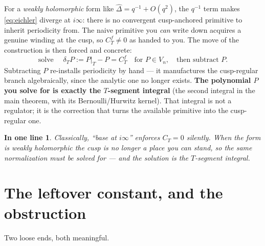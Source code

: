 \documentclass[11pt]{article}
\newcommand{\Vn}{V_n}
\newtheorem*{slogan}{In one line}
\begin{document}
For a \emph{weakly holomorphic} form like $\widehat\Delta = q^{-1} +
O(q^2)$, the $q^{-1}$ term makes \eqref{eq:eichler} diverge at $i\infty$:
there is no convergent cusp-anchored primitive to inherit periodicity
from. The naive primitive you \emph{can} write down acquires a genuine
winding at the cusp, so $C^f_T \neq 0$ as handed to you. The move of the
construction is then forced and concrete:
\begin{equation}\label{eq:reimpose}
  \text{solve } \quad \delta_T P := P\big|_T - P = C^f_T
  \quad\text{for } P \in \Vn, \quad\text{then subtract } P.
\end{equation}
Subtracting $P$ re-installs periodicity by hand --- it manufactures the
cusp-regular branch algebraically, since the analytic one no longer
exists. \textbf{The polynomial $P$ you solve for is exactly the
$T$-segment integral} (the second integral in the main theorem, with its
Bernoulli/Hurwitz kernel). That integral is not a regulator; it is the
correction that turns the available primitive into the cusp-regular one.

\begin{slogan}
Classically, ``base at $i\infty$'' enforces $C_T=0$ silently. When the
form is weakly holomorphic the cusp is no longer a place you can stand,
so the same normalization must be \emph{solved for} --- and the solution
is the $T$-segment integral.
\end{slogan}

\section{The leftover constant, and the obstruction}

Two loose ends, both meaningful.
\end{document}
